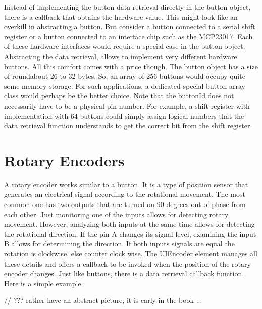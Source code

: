 Instead of implementing the button data retrieval directly in the button object, there is a callback that obtains the hardware value. This might look like an overkill in abstracting a button. But consider a button connected to a serial shift register or a button connected to an interface chip such as the MCP23017. Each of these hardware interfaces would require a special case in the button object. Abstracting the data retrieval, allows to implement very different hardware buttons. All this comfort comes with a price though. The button object has a size of roundabout 26 to 32 bytes. So, an array of 256 buttons would occupy quite some memory storage. For such applications, a dedicated special button array class would perhaps be the better choice. Note that the buttonId does not necessarily have to be a physical pin number. For example, a shift register with implementation with 64 buttons could simply assign logical numbers that the data retrieval function understands to get the correct bit from the shift register.

\section{Rotary Encoders}

A rotary encoder works similar to a button. It is a type of position sensor that generates an electrical signal according to the rotational movement. The most common one has two outputs that are turned on 90 degrees out of phase from each other. Just monitoring one of the inputs allows for detecting rotary movement. However, analyzing both inputs at the same time allows for detecting the rotational direction. If the pin A changes its signal level, examining the input B allows for determining the direction. If both inputs signals are equal the rotation is clockwise, else counter clock wise. The UIEncoder element manages all these details and offers a callback to be invoked when the position of the rotary encoder changes. Just like buttons, there is a data retrieval callback function. Here is a simple example.

// ??? rather have an abstract picture, it is early in the book ...


